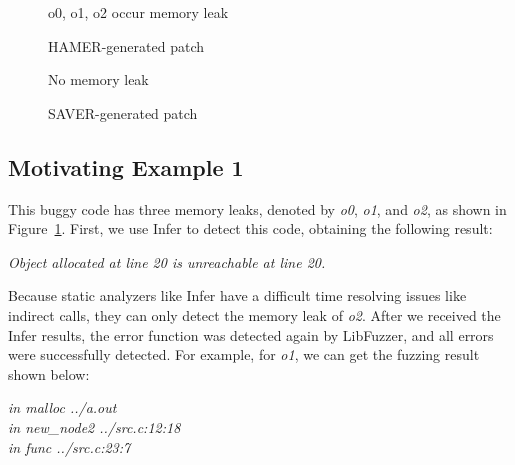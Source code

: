 \documentclass[a4j,dvipdfmx]{article}
\begin{document}
\begin{figure*}
  \begin{subfigure}{0.47\textwidth}
    
    \caption{o0, o1, o2 occur memory leak}
    \label{me1a}
  \end{subfigure}\hfill
  \begin{subfigure}{0.45\textwidth}
    
    \caption{HAMER-generated patch}
    \label{me1b}
  \end{subfigure}
  \caption{Motivating Example 1: Infer false-negative alarm} 
  \label{me1}
\end{figure*}

\begin{figure*}
  \begin{subfigure}{0.47\textwidth}
    
    \caption{No memory leak}
  \end{subfigure}\hfill
  \begin{subfigure}{0.45\textwidth}
    
    \caption{SAVER-generated patch}
  \end{subfigure}
  \caption{Motivating Example 2: Infer false-positive alarm}
  \label{me2}
\end{figure*}

\subsection{Motivating Example 1}
This buggy code has three memory leaks, denoted by {\it o0}, {\it o1}, and {\it o2}, as shown in Figure~\ref{me1a}. First, we use Infer to detect this code, obtaining the following result:

\begin{minipage}{\textwidth}
\vspace{0.2cm}
\textsl{\hspace{0.3cm}Object allocated at line 20 is unreachable at line 20.\\}
\end{minipage}

Because static analyzers like Infer have a difficult time resolving issues like indirect calls, they can only detect the memory leak of {\it o2}. After we received the Infer results, the error function was detected again by LibFuzzer, and all errors were successfully detected. For example, for {\it o1}, we can get the fuzzing result shown below:


\begin{minipage}{\textwidth}
    \vspace{0.2cm}
    \textsl{\hspace{0.3cm}in malloc ../a.out\\\hspace{0.3cm}in new\_node2 ../src.c:12:18\\\hspace{0.3cm}in func ../src.c:23:7\\}
\end{minipage}
\end{document}
